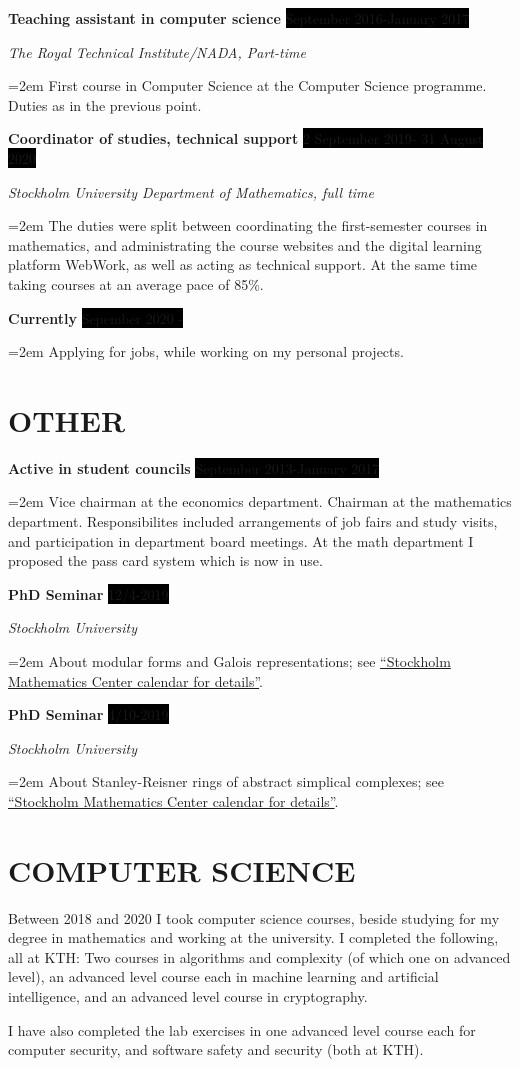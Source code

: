 \documentclass[paper=a4,fontsize=11pt]{scrartcl} %
\newcommand{\NewPart}[1]{\section*{\uppercase{#1}}}
\newcommand{\EducationEntry}[4]{
		\noindent \textbf{#1} \hfill      %
		\colorbox{Black}{%
			\parbox{6em}{%
			\hfill\color{White}#2}} \par  %
		\noindent \textit{#3} \par        %
		\noindent\hangindent=2em\hangafter=0 \small #4 %
		\normalsize \par}
\newcommand{\WorkEntry}[4]{				  %
		\noindent \textbf{#1} \hfill      %
		\colorbox{Black}{\color{White}#2} \par  %
		\noindent \textit{#3} \par              %
		\noindent\hangindent=2em\hangafter=0 \small #4 %
		\normalsize \par}
\begin{document}
\WorkEntry{Teaching assistant in computer science}{September 2016-January 2017}{The Royal Technical Institute/NADA, Part-time}{First course in Computer Science at the Computer Science programme. Duties as in the previous point.}

\WorkEntry{Coordinator of studies, technical support}{2 September 2019- 31 August 2020}{Stockholm University Department of Mathematics, full time}{The duties were split between coordinating the first-semester courses in mathematics, and administrating the course websites and the digital learning platform WebWork, as well as acting as technical support. At the same time taking courses at an average pace of 85\%.}

\WorkEntry{Currently}{Sepember 2020 - }{}{Applying for jobs, while working on my personal projects.}

\NewPart{Other}

\WorkEntry{Active in student councils}{September 2013-January 2017}{}{Vice chairman at the economics department. Chairman at the mathematics department. Responsibilites included arrangements of job fairs and study visits, and participation in department board meetings. At the math department I proposed the pass card system which is now in use.}

\WorkEntry{PhD Seminar}{12/4-2019}{Stockholm University}{About modular forms and Galois representations; see \href{https://www.math-stockholm.se/kalender/johann-selewa-modular-forms-and-galois-representations-1.894047}{``Stockholm Mathematics Center calendar for details''}.}

\WorkEntry{PhD Seminar}{4/10-2019}{Stockholm University}{About Stanley-Reisner rings of abstract simplical complexes; see \href{https://www.math-stockholm.se/kalender/johann-selewa-stanley-reisner-rings-of-abstract-simplicial-complexes-1.927681}{``Stockholm Mathematics Center calendar for details''}.}




\NewPart{Computer Science}{}

Between 2018 and 2020 I took computer science courses, beside studying for my degree in mathematics and working at the university. I completed the following, all at KTH:  Two courses in algorithms and complexity (of which one on advanced level),  an advanced level course each in machine learning and artificial intelligence, and an advanced level course in cryptography.

I have also completed the lab exercises in one advanced level course each for computer security, and software safety and security (both at KTH).
\end{document}
